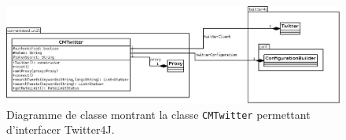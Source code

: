\documentclass[12pt,a4paper]{report}
\begin{document}
\begin{landscape}
    \begin{figure}
        \includegraphics[width=25cm]{img/uml_cmtwitter.jpeg}
        \caption{Diagramme de classe montrant la classe \texttt{CMTwitter}
        permettant d'interfacer Twitter4J.}
        \label{uml_cmtwitter}
    \end{figure}
\end{landscape}
\end{document}
